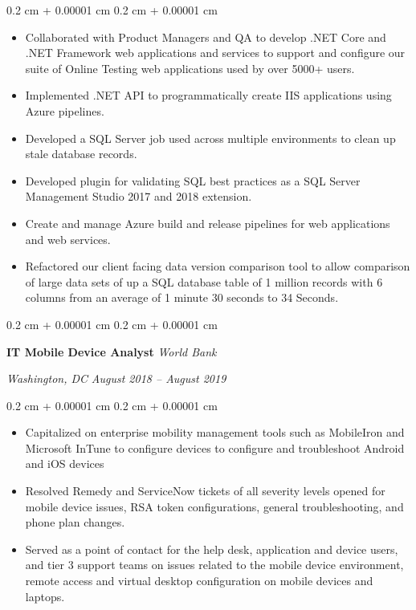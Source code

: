\documentclass[10pt, letterpaper]{article}
\newenvironment{highlights}{
    \begin{itemize}[
        topsep=0.10 cm,
        parsep=0.10 cm,
        partopsep=0pt,
        itemsep=0pt,
        leftmargin=0.4 cm + 10pt
        ]
    }{
\end{itemize}
} %
\newenvironment{onecolentry}{
    \begin{adjustwidth}{
            0.2 cm + 0.00001 cm
        }{
            0.2 cm + 0.00001 cm
        }
    }{
    \end{adjustwidth}
} %
\newenvironment{twocolentry}[2][]{
    \onecolentry
    \def\secondColumn{#2}
    \setcolumnwidth{\fill, 10.5 cm}
    \begin{paracol}{2}
    }{
        \switchcolumn \raggedleft \secondColumn
    \end{paracol}
    \endonecolentry
} %
\begin{document}
    \vspace{0.10 cm}
    \begin{onecolentry}
        \begin{highlights}
        \item Collaborated with Product Managers and QA to develop .NET Core and .NET Framework web applications and services to support and configure our suite of Online Testing web applications used by over 5000+ users.
        \item Implemented .NET API to programmatically create IIS applications using Azure pipelines.
        \item Developed a SQL Server job used across multiple environments to clean up stale database records.
        \item Developed plugin for validating SQL best practices as a SQL Server Management Studio 2017 and 2018 extension.
        \item Create and manage Azure build and release pipelines for web applications and web services.
        \item Refactored our client facing data version comparison tool to allow comparison of large data sets of up a SQL database table of 1 million records with 6 columns from an average of 1 minute 30 seconds to  34 Seconds.
        \end{highlights}
    \end{onecolentry}
    \begin{twocolentry}{
        \textit{Washington, DC}
        \textit{August 2018 – August 2019}}
        \textbf{IT Mobile Device Analyst}
        \textit{World Bank}
    \end{twocolentry}
    \vspace{0.10 cm}
    \begin{onecolentry}
        \begin{highlights}
        \item Capitalized on enterprise mobility management tools such as MobileIron and Microsoft InTune to configure devices to configure and troubleshoot Android and iOS devices
        \item Resolved Remedy and ServiceNow tickets of all severity levels opened for mobile device issues, RSA token configurations, general troubleshooting, and phone plan changes.
        \item Served as a point of contact for the help desk, application and device users, and tier 3 support teams on issues related to the mobile device environment, remote access and virtual desktop configuration on mobile devices and laptops.
        \end{highlights}
    \end{onecolentry}
\end{document}

